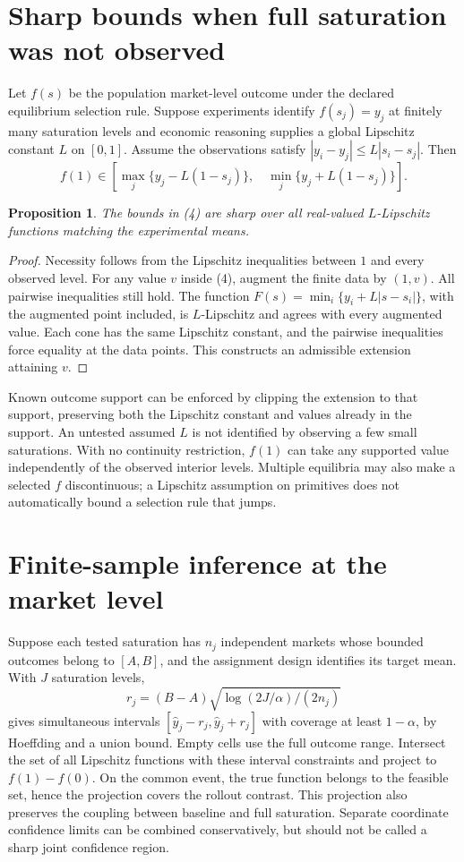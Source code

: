 \documentclass[11pt,a4paper]{article}
\newtheorem{proposition}[theorem]{Proposition}
\begin{document}
\section{Sharp bounds when full saturation was not observed}
Let $f(s)$ be the population market-level outcome under the declared equilibrium selection rule. Suppose experiments identify $f(s_j)=y_j$ at finitely many saturation levels and economic reasoning supplies a global Lipschitz constant $L$ on $[0,1]$. Assume the observations satisfy $|y_i-y_j|\le L|s_i-s_j|$. Then
\[
 f(1)\in\left[
  \max_j\{y_j-L(1-s_j)\},\quad
  \min_j\{y_j+L(1-s_j)\}\right]. \tag{4}
\]
\begin{proposition}
The bounds in (4) are sharp over all real-valued $L$-Lipschitz functions matching the experimental means.
\end{proposition}
\begin{proof}
Necessity follows from the Lipschitz inequalities between $1$ and every observed level. For any value $v$ inside (4), augment the finite data by $(1,v)$. All pairwise inequalities still hold. The function
$F(s)=\min_i\{y_i+L|s-s_i|\}$, with the augmented point included, is $L$-Lipschitz and agrees with every augmented value. Each cone has the same Lipschitz constant, and the pairwise inequalities force equality at the data points. This constructs an admissible extension attaining $v$.
\end{proof}
Known outcome support can be enforced by clipping the extension to that support, preserving both the Lipschitz constant and values already in the support. An untested assumed $L$ is not identified by observing a few small saturations. With no continuity restriction, $f(1)$ can take any supported value independently of the observed interior levels. Multiple equilibria may also make a selected $f$ discontinuous; a Lipschitz assumption on primitives does not automatically bound a selection rule that jumps.

\section{Finite-sample inference at the market level}
Suppose each tested saturation has $n_j$ independent markets whose bounded outcomes belong to $[A,B]$, and the assignment design identifies its target mean. With $J$ saturation levels,
\[
 r_j=(B-A)\sqrt{\log(2J/\alpha)/(2n_j)}
\]
gives simultaneous intervals $[\widehat y_j-r_j,\widehat y_j+r_j]$ with coverage at least $1-\alpha$, by Hoeffding and a union bound. Empty cells use the full outcome range. Intersect the set of all Lipschitz functions with these interval constraints and project to $f(1)-f(0)$. On the common event, the true function belongs to the feasible set, hence the projection covers the rollout contrast. This projection also preserves the coupling between baseline and full saturation. Separate coordinate confidence limits can be combined conservatively, but should not be called a sharp joint confidence region.
\end{document}
